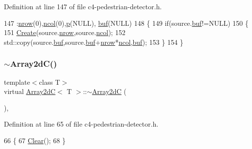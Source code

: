 Definition at line 147 of file c4-\/pedestrian-\/detector.\+h.


\begin{DoxyCode}
147                                               :\mbox{\hyperlink{class_array2d_c_a12f690f7195f7674a86a7e1eedbc473c}{nrow}}(0),\mbox{\hyperlink{class_array2d_c_a27e0f8f40f644831cd7c750db59dc28a}{ncol}}(0),\mbox{\hyperlink{class_array2d_c_a727eae5d663d463635cc150e6f771f0d}{p}}(NULL),
      \mbox{\hyperlink{class_array2d_c_a25d8fa5049d4c7ded126e0acdd18f37a}{buf}}(NULL)
148 \{
149     \textcolor{keywordflow}{if}(source.\mbox{\hyperlink{class_array2d_c_a25d8fa5049d4c7ded126e0acdd18f37a}{buf}}!=NULL)
150     \{
151         \mbox{\hyperlink{class_array2d_c_abfe87be7641dfc586b9e7bffebcca9ec}{Create}}(source.\mbox{\hyperlink{class_array2d_c_a12f690f7195f7674a86a7e1eedbc473c}{nrow}},source.\mbox{\hyperlink{class_array2d_c_a27e0f8f40f644831cd7c750db59dc28a}{ncol}});
152         std::copy(source.\mbox{\hyperlink{class_array2d_c_a25d8fa5049d4c7ded126e0acdd18f37a}{buf}},source.\mbox{\hyperlink{class_array2d_c_a25d8fa5049d4c7ded126e0acdd18f37a}{buf}}+\mbox{\hyperlink{class_array2d_c_a12f690f7195f7674a86a7e1eedbc473c}{nrow}}*\mbox{\hyperlink{class_array2d_c_a27e0f8f40f644831cd7c750db59dc28a}{ncol}},\mbox{\hyperlink{class_array2d_c_a25d8fa5049d4c7ded126e0acdd18f37a}{buf}});
153     \}
154 \}
\end{DoxyCode}
\mbox{\label{class_array2d_c_a96e68b849ec674616b79dc9d0c9233ab}} 
\subsubsection{\texorpdfstring{$\sim$\+Array2d\+C()}{~Array2dC()}}
{\footnotesize\ttfamily template$<$class T$>$ \\
virtual \mbox{\hyperlink{class_array2d_c}{Array2dC}}$<$ T $>$\+::$\sim$\mbox{\hyperlink{class_array2d_c}{Array2dC}} (\begin{DoxyParamCaption}{ }\end{DoxyParamCaption})\hspace{0.3cm}{\ttfamily [inline]}, {\ttfamily [virtual]}}



Definition at line 65 of file c4-\/pedestrian-\/detector.\+h.


\begin{DoxyCode}
66     \{
67         \mbox{\hyperlink{class_array2d_c_a76a406cfeb9a9f75a1586e0a7b22f63e}{Clear}}();
68     \}
\end{DoxyCode}


